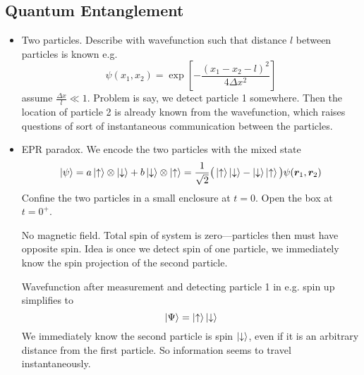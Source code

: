\documentclass[11pt, a4paper]{article}
\renewcommand{\vec}[1]{\bm{#1}}  %
\newcommand{\ua}{\uparrow}  %
\newcommand{\da}{\downarrow}  %
\renewcommand{\r}{\vec{r}}  %
\begin{document}
\subsection{Quantum Entanglement}
\begin{itemize}
    \item Two particles. Describe with wavefunction such that distance $ l $ between particles is known e.g.
    \begin{equation*}
        \psi(x_{1}, x_{2}) = \exp \left[ - \frac{(x_{1} - x_{2} - l)^{2}}{4 \Delta x^{2}} \right]
    \end{equation*}
    assume $ \frac{\Delta x}{l} \ll 1 $. Problem is say, we detect particle 1 somewhere. Then the location of particle 2 is already known from the wavefunction, which raises questions of sort of instantaneous communication between the particles.
    
    \item EPR paradox. We encode the two particles with the mixed state
    \begin{equation*}
        \ket{\psi} = a \ket{\ua} \otimes \ket{\da} + b \ket{\da} \otimes \ket{\ua} = \frac{1}{\sqrt{2}} \big( \ket{\ua}\ket{\da} - \ket{\da}\ket{\ua} \big)\psi(\r_{1}, \r_{2})
    \end{equation*}
    Confine the two particles in a small enclosure at $ t = 0 $. Open the box at $ t = 0^{+} $. 

    No magnetic field. Total spin of system is zero---particles then must have opposite spin. Idea is once we detect spin of one particle, we immediately know the spin projection of the second particle. 

    Wavefunction after measurement and detecting particle 1 in e.g. spin up simplifies to
    \begin{equation*}
        \ket{\Psi} = \ket{\ua}\ket{\da}
    \end{equation*}
    We immediately know the second particle is spin $ \ket{\da} $, even if it is an arbitrary distance from the first particle. So information seems to travel instantaneously. 
    
    
    
    
    
\end{itemize}
\end{document}
